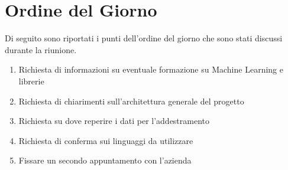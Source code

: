 \documentclass{article}
\begin{document}
\section{Ordine del Giorno}%
\label{ordine_del_giorno}
Di seguito sono riportati i punti dell'ordine del giorno che sono stati discussi durante la riunione.
\begin{enumerate}
  \item Richiesta di informazioni su eventuale formazione su Machine Learning e librerie
  \item Richiesta di chiarimenti sull'architettura generale del progetto
  \item Richiesta su dove reperire i dati per l'addestramento
  \item Richiesta di conferma sui linguaggi da utilizzare
  \item Fissare un secondo appuntamento con l'azienda
\end{enumerate}
\end{document}
